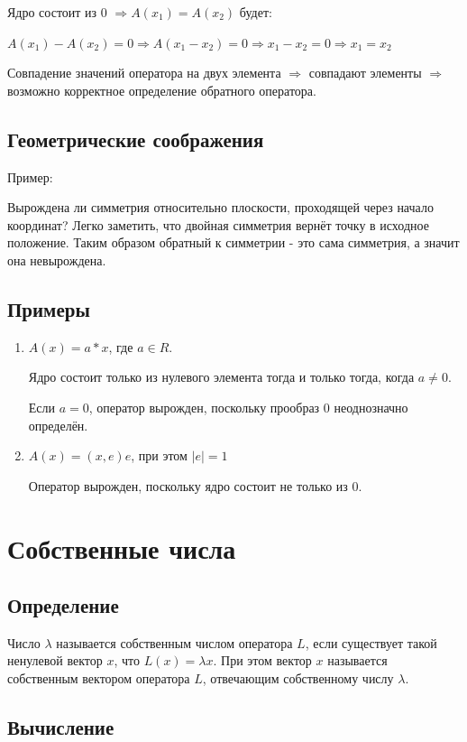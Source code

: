\documentclass[12pt]{article}
\begin{document}
Ядро состоит из 0 $\Rightarrow A(x_1) = A(x_2)$ будет:

$A(x_1) - A(x_2) = 0 \Rightarrow A(x_1 - x_2) = 0 \Rightarrow x_1 - x_2 = 0 \Rightarrow x_1 = x_2$

Совпадение значений оператора на двух элемента $\Rightarrow$ совпадают элементы $\Rightarrow$ возможно корректное определение обратного оператора.

\subsection{Геометрические соображения}
Пример:

Вырождена ли симметрия относительно плоскости, проходящей через начало координат? Легко заметить, что двойная симметрия вернёт точку в исходное положение. Таким образом обратный к симметрии - это сама симметрия, а значит она невырождена.

\subsection{Примеры}
\begin{enumerate}
    \item $A(x) = a * x$, где $a \in R$.

          Ядро состоит только из нулевого элемента тогда и только тогда, когда $a \neq 0$.

          Если $a = 0$, оператор вырожден, поскольку прообраз 0 неоднозначно определён.

    \item $A(x) = (x,e)e$, при этом $|e| = 1$

          Оператор вырожден, поскольку ядро состоит не только из 0.
\end{enumerate}

\section{Собственные числа}
\subsection{Определение}
Число $\lambda$ называется собственным числом оператора $L$, если существует такой ненулевой вектор $x$, что $L(x) = \lambda x$. При этом вектор $x$ называется собственным вектором оператора $L$, отвечающим собственному числу $\lambda$.

\subsection{Вычисление}
\end{document}
